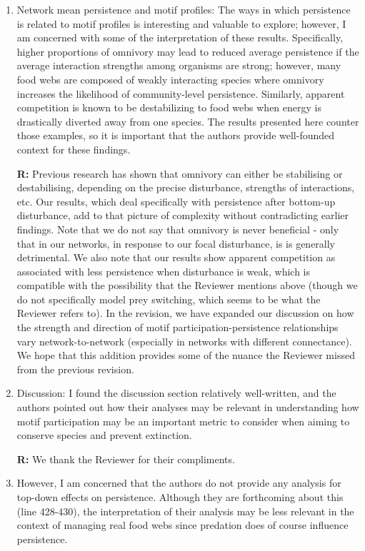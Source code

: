 \documentclass[12pt]{article}
\begin{document}
\begin{enumerate}
            \item Network mean persistence and motif profiles: The ways in which persistence is related to motif profiles is interesting and valuable to explore; however, I am concerned with some of the interpretation of these results. Specifically, higher proportions of omnivory may lead to reduced average persistence if the average interaction strengths among organisms are strong; however, many food webs are composed of weakly interacting species where omnivory increases the likelihood of community-level persistence. Similarly, apparent competition is known to be destabilizing to food webs when energy is drastically diverted away from one species. The results presented here counter those examples, so it is important that the authors provide well-founded context for these findings.

                \textbf{R:} Previous research has shown that omnivory can either be stabilising or destabilising, depending on the precise disturbance, strengths of interactions, etc. Our results, which deal specifically with persistence after bottom-up disturbance, add to that picture of complexity without contradicting earlier findings. Note that we do not say that omnivory is never beneficial - only that in our networks, in response to our focal disturbance, is is generally detrimental. We also note that our results show apparent competition as associated with less persistence when disturbance is weak, which is compatible with the possibility that the Reviewer mentions above (though we do not specifically model prey switching, which seems to be what the Reviewer refers to).  In the revision, we have expanded our discussion on how the strength and direction of motif participation-persistence relationships vary network-to-network (especially in networks with different connectance). We hope that this addition provides some of the nuance the Reviewer missed from the previous revision.


            \item Discussion: I found the discussion section relatively well-written, and the authors pointed out how their analyses may be relevant in understanding how motif participation may be an important metric to consider when aiming to conserve species and prevent extinction.

                \textbf{R:} We thank the Reviewer for their compliments.


            \item However, I am concerned that the authors do not provide any analysis for top-down effects on persistence. Although they are forthcoming about this (line 428-430), the interpretation of their analysis may be less relevant in the context of managing real food webs since predation does of course influence persistence.


\end{enumerate}
\end{document}
